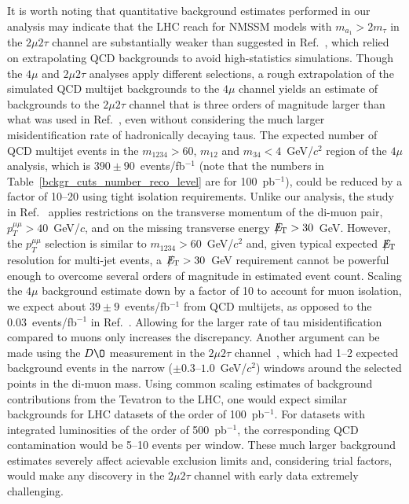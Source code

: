 \documentclass[aps,prl,twocolumn,nofootinbib,superscriptaddress]{revtex4}
\begin{document}
It is worth noting that quantitative background estimates performed in
our analysis may indicate that the LHC reach for NMSSM models with
$m_{a_1} > 2m_\tau$ in the $2\mu 2\tau$ channel are substantially
weaker than suggested in Ref.~\cite{2mu2tau-pheno}, which relied on
extrapolating QCD backgrounds to avoid high-statistics simulations.
Though the $4\mu$ and $2\mu 2\tau$ analyses apply different
selections, a rough extrapolation of the simulated QCD multijet
backgrounds to the $4\mu$ channel yields an estimate of backgrounds to
the $2\mu 2\tau$ channel that is three orders of magnitude larger than
what was used in Ref.~\cite{2mu2tau-pheno}, even without considering
the much larger misidentification rate of hadronically decaying taus.
The expected number of QCD multijet events in the $m_{1234} > 60$,
$m_{12}$ and $m_{34} < 4$~GeV/$c^2$ region of the $4\mu$ analysis,
which is $390 \pm 90$~events/fb$^{-1}$ (note that the numbers in
Table~\ref{bckgr_cuts_number_reco_level} are for 100~pb$^{-1}$), could
be reduced by a factor of 10--20 using tight isolation requirements.
Unlike our analysis, the study in Ref.~\cite{2mu2tau-pheno} applies
restrictions on the transverse momentum of the di-muon pair,
$p_T^{\mu\mu} > 40$~GeV/$c$, and on the missing transverse energy
$\mbox{${E\!\!\!\!/_{\rm T}}$} > 30$~GeV.  However, the $p_T^{\mu\mu}$ selection is similar to
$m_{1234} > 60$~GeV/$c^2$ and, given typical expected $\mbox{${E\!\!\!\!/_{\rm T}}$}$
resolution for multi-jet events, a $\mbox{${E\!\!\!\!/_{\rm T}}$} > 30$~GeV requirement cannot
be powerful enough to overcome several orders of magnitude in
estimated event count.  Scaling the $4\mu$ background estimate down by
a factor of 10 to account for muon isolation, we expect about $39 \pm
9$~events/fb$^{-1}$ from QCD multijets, as opposed to the
0.03~events/fb$^{-1}$ in Ref.~\cite{2mu2tau-pheno}.  Allowing for the
larger rate of tau misidentification compared to muons only increases
the discrepancy.  Another argument can be made using the $D\O$
measurement in the $2 \mu 2\tau$ channel~\cite{d0-low-ma}, which had
1--2 expected background events in the narrow ($\pm
0.3$--$1.0$~GeV/$c^2$) windows around the selected points in the
di-muon mass.  Using common scaling estimates of background
contributions from the Tevatron to the LHC, one would expect similar
backgrounds for LHC datasets of the order of 100~pb$^{-1}$.  For
datasets with integrated luminosities of the order of 500~pb$^{-1}$,
the corresponding QCD contamination would be 5--10 events per window.
These much larger background estimates severely affect acievable
exclusion limits and, considering trial factors, would make any
discovery in the $2\mu 2\tau$ channel with early data extremely
challenging.
\end{document}
